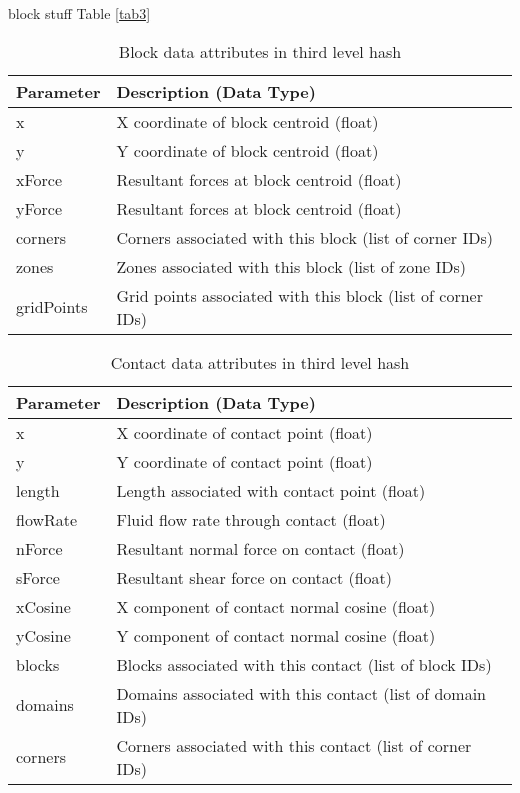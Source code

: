 block stuff Table \ref{tab3}

\begin{table}[!htb]
\centering
\caption{{Block data attributes in third level hash}}
\label{tab1}
\begin{tabularx}{\textwidth}{@{}Yp{0.75\textwidth}@{}}
\toprule
\textbf{Parameter} & \textbf{Description (Data Type)}                            \\ \midrule
x                  & X coordinate of block centroid (float)                      \\
y                  & Y coordinate of block centroid (float)                      \\
xForce             & Resultant forces at block centroid (float)                  \\
yForce             & Resultant forces at block centroid (float)                  \\
corners            & Corners associated with this block (list of corner IDs)     \\
zones              & Zones associated with this block (list of zone IDs)         \\
gridPoints         & Grid points associated with this block (list of corner IDs) \\ \bottomrule
\end{tabularx}
\end{table}

\begin{table}[!htb]
\centering
\caption{{Contact data attributes in third level hash}}
\label{tab2}
\begin{tabularx}{\textwidth}{@{}Yp{0.75\textwidth}@{}}
\toprule
\textbf{Parameter} & \textbf{Description (Data Type)}                          \\ \midrule
x                  & X coordinate of contact point (float)                     \\
y                  & Y coordinate of contact point (float)                     \\
length             & Length associated with contact point (float)              \\
flowRate           & Fluid flow rate through contact (float)                   \\
nForce             & Resultant normal force on contact (float)                 \\
sForce             & Resultant shear force on contact (float)                  \\
xCosine            & X component of contact normal cosine (float)              \\
yCosine            & Y component of contact normal cosine (float)              \\
blocks             & Blocks associated with this contact (list of block IDs)   \\
domains            & Domains associated with this contact (list of domain IDs) \\
corners            & Corners associated with this contact (list of corner IDs) \\ \bottomrule
\end{tabularx}
\end{table}

